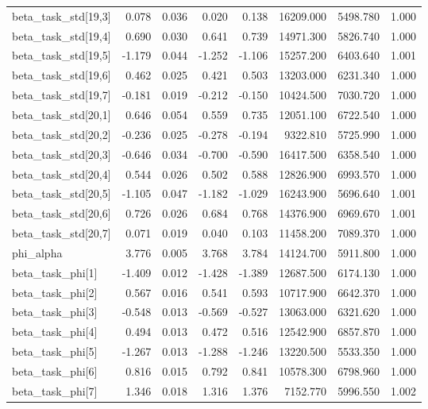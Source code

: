 \begin{tabular}{lrrrrrrr}
beta\_task\_std[19,3] & 0.078 & 0.036 & 0.020 & 0.138 & 16209.000 & 5498.780 & 1.000 \\
beta\_task\_std[19,4] & 0.690 & 0.030 & 0.641 & 0.739 & 14971.300 & 5826.740 & 1.000 \\
beta\_task\_std[19,5] & -1.179 & 0.044 & -1.252 & -1.106 & 15257.200 & 6403.640 & 1.001 \\
beta\_task\_std[19,6] & 0.462 & 0.025 & 0.421 & 0.503 & 13203.000 & 6231.340 & 1.000 \\
beta\_task\_std[19,7] & -0.181 & 0.019 & -0.212 & -0.150 & 10424.500 & 7030.720 & 1.000 \\
beta\_task\_std[20,1] & 0.646 & 0.054 & 0.559 & 0.735 & 12051.100 & 6722.540 & 1.000 \\
beta\_task\_std[20,2] & -0.236 & 0.025 & -0.278 & -0.194 & 9322.810 & 5725.990 & 1.000 \\
beta\_task\_std[20,3] & -0.646 & 0.034 & -0.700 & -0.590 & 16417.500 & 6358.540 & 1.000 \\
beta\_task\_std[20,4] & 0.544 & 0.026 & 0.502 & 0.588 & 12826.900 & 6993.570 & 1.000 \\
beta\_task\_std[20,5] & -1.105 & 0.047 & -1.182 & -1.029 & 16243.900 & 5696.640 & 1.001 \\
beta\_task\_std[20,6] & 0.726 & 0.026 & 0.684 & 0.768 & 14376.900 & 6969.670 & 1.001 \\
beta\_task\_std[20,7] & 0.071 & 0.019 & 0.040 & 0.103 & 11458.200 & 7089.370 & 1.000 \\
phi\_alpha & 3.776 & 0.005 & 3.768 & 3.784 & 14124.700 & 5911.800 & 1.000 \\
beta\_task\_phi[1] & -1.409 & 0.012 & -1.428 & -1.389 & 12687.500 & 6174.130 & 1.000 \\
beta\_task\_phi[2] & 0.567 & 0.016 & 0.541 & 0.593 & 10717.900 & 6642.370 & 1.000 \\
beta\_task\_phi[3] & -0.548 & 0.013 & -0.569 & -0.527 & 13063.000 & 6321.620 & 1.000 \\
beta\_task\_phi[4] & 0.494 & 0.013 & 0.472 & 0.516 & 12542.900 & 6857.870 & 1.000 \\
beta\_task\_phi[5] & -1.267 & 0.013 & -1.288 & -1.246 & 13220.500 & 5533.350 & 1.000 \\
beta\_task\_phi[6] & 0.816 & 0.015 & 0.792 & 0.841 & 10578.300 & 6798.960 & 1.000 \\
beta\_task\_phi[7] & 1.346 & 0.018 & 1.316 & 1.376 & 7152.770 & 5996.550 & 1.002 \\
\bottomrule
\end{tabular}
